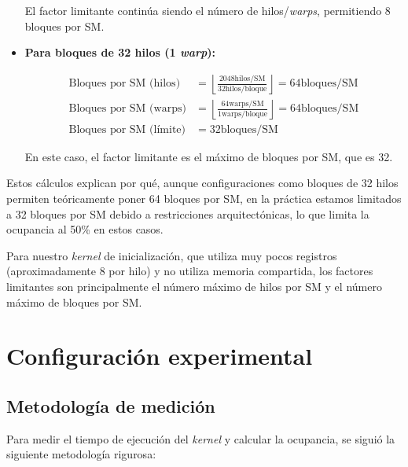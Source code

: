 \begin{itemize}
                    El factor limitante continúa siendo el número de hilos/\textit{warps}, permitiendo 8 bloques por SM.
                    
                \item \textbf{Para bloques de 32 hilos (1 \textit{warp}):}
                
                    \begin{align*}
                        \text{Bloques por SM (hilos)} &= \left\lfloor \frac{2048 \text{hilos/SM}}{32 \text{hilos/bloque}} \right\rfloor = 64 \text{bloques/SM}\\
                        \text{Bloques por SM (warps)} &= \left\lfloor \frac{64 \text{warps/SM}}{1 \text{warps/bloque}} \right\rfloor = 64 \text{bloques/SM}\\
                        \text{Bloques por SM (límite)} &= 32 \text{bloques/SM}
                    \end{align*}
                    
                    En este caso, el factor limitante es el máximo de bloques por SM, que es 32.
                    
            \end{itemize}
            
            Estos cálculos explican por qué, aunque configuraciones como bloques de 32 hilos permiten teóricamente poner 64 bloques por SM, en la práctica estamos limitados a 32 bloques por SM debido a restricciones arquitectónicas, lo que limita la ocupancia al 50\% en estos casos.
            
            Para nuestro \textit{kernel} de inicialización, que utiliza muy pocos registros (aproximadamente 8 por hilo) y no utiliza memoria compartida, los factores limitantes son principalmente el número máximo de hilos por SM y el número máximo de bloques por SM.

\newpage
       
\section{Configuración experimental}

    \subsection{Metodología de medición}

        Para medir el tiempo de ejecución del \textit{kernel} y calcular la ocupancia, se siguió la siguiente metodología rigurosa:
    
